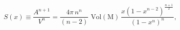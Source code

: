 \begin{equation}
S(x) \equiv \frac{A^{n+1}}{V^n}=\frac{4\pi
\,n^n}{(n-2)}\,\,\mathrm{Vol(M)}\,\frac{x(1-x^{n-2})^{\frac{n+1}{2}}}{(1-x^n)^n},
\label{Schrat}
\end{equation}

